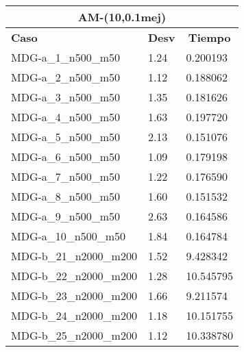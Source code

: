 \documentclass[10pt,a4paper]{article}
\begin{document}
\begin{table}[]
	\centering
	\begin{tabular}{|l|l|l|}
		\hline
		\multicolumn{3}{|c|}{\textbf{AM-(10,0.1mej)}}                                                                 \\ \hline
		\textbf{Caso}          & \multicolumn{1}{c|}{\textbf{Desv}} & \multicolumn{1}{c|}{\textbf{Tiempo}} \\ \hline
		MDG-a\_1\_n500\_m50    & 1.24                               & 0.200193                             \\ \hline
		MDG-a\_2\_n500\_m50    & 1.12                               & 0.188062                             \\ \hline
		MDG-a\_3\_n500\_m50    & 1.35                               & 0.181626                             \\ \hline
		MDG-a\_4\_n500\_m50    & 1.63                               & 0.197720                             \\ \hline
		MDG-a\_5\_n500\_m50    & 2.13                               & 0.151076                             \\ \hline
		MDG-a\_6\_n500\_m50    & 1.09                               & 0.179198                             \\ \hline
		MDG-a\_7\_n500\_m50    & 1.22                               & 0.176590                             \\ \hline
		MDG-a\_8\_n500\_m50    & 1.60                               & 0.151532                             \\ \hline
		MDG-a\_9\_n500\_m50    & 2.63                               & 0.164586                             \\ \hline
		MDG-a\_10\_n500\_m50   & 1.84                               & 0.164784                             \\ \hline
		MDG-b\_21\_n2000\_m200 & 1.52                               & 9.428342                             \\ \hline
		MDG-b\_22\_n2000\_m200 & 1.28                               & 10.545795                            \\ \hline
		MDG-b\_23\_n2000\_m200 & 1.66                               & 9.211574                             \\ \hline
		MDG-b\_24\_n2000\_m200 & 1.18                               & 10.151755                            \\ \hline
		MDG-b\_25\_n2000\_m200 & 1.12                               & 10.338780                            \\ \hline

\end{tabular}
\end{table}
\end{document}

